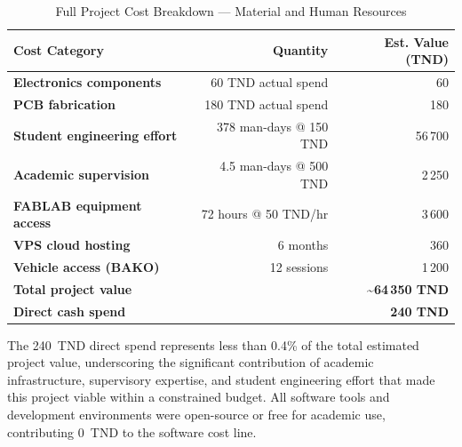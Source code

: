 \begin{table}[H]
\centering
\caption{Full Project Cost Breakdown --- Material and Human Resources}
\label{tab:project-cost}
\begin{tabular}{>{\bfseries}p{5.5cm} r r}
\toprule
Cost Category & Quantity & Est. Value (TND) \\
\midrule
Electronics components     & 60 TND actual spend     & 60 \\
PCB fabrication            & 180 TND actual spend    & 180 \\
Student engineering effort & 378 man-days @ 150 TND  & 56\,700 \\
Academic supervision       & 4.5 man-days @ 500 TND  & 2\,250 \\
FABLAB equipment access    & 72 hours @ 50 TND/hr    & 3\,600 \\
VPS cloud hosting          & 6 months                & 360 \\
Vehicle access (BAKO)      & 12 sessions             & 1\,200 \\
\midrule
\textbf{Total project value} & & \textbf{\textasciitilde 64\,350 TND} \\
\textbf{Direct cash spend}   & & \textbf{240 TND} \\
\bottomrule
\end{tabular}
\end{table}

The 240~TND direct spend represents less than 0.4\% of the total estimated project value, underscoring the significant contribution of academic infrastructure, supervisory expertise, and student engineering effort that made this project viable within a constrained budget. All software tools and development environments were open-source or free for academic use, contributing 0~TND to the software cost line.
